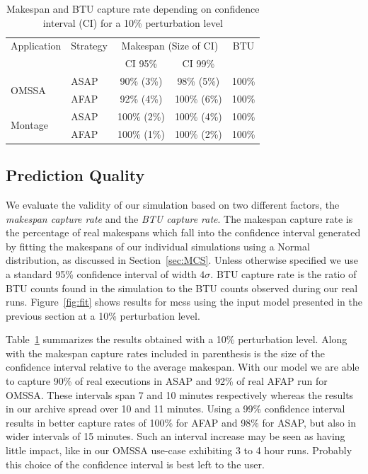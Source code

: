 \documentclass[10pt,conference,compsocconf]{IEEEtran}
\begin{document}
\begin{table}
	\centering
	\caption{Makespan and BTU capture rate depending on confidence interval
          (CI) for a 10\% perturbation level}\label{tab:fit}
	\begin{tabular}{llccc}
		\toprule
		Application&Strategy&\multicolumn{2}{c}{Makespan (Size of CI)}&BTU\\
                           &         & CI 95\% & CI 99\% &\\
		\midrule
		\multirow{2}{*}{OMSSA}&ASAP&  90\% (3\%)&  98\% (5\%)& 100\%\\
				      &AFAP&  92\% (4\%)& 100\% (6\%)& 100\%\\
		\midrule
		\multirow{2}{*}{Montage}&ASAP& 100\% (2\%)& 100\% (4\%)& 100\%\\
					&AFAP& 100\% (1\%)& 100\% (2\%)& 100\%\\
		\bottomrule
	\end{tabular}
\end{table}
\subsection{Prediction Quality}\label{sec:pq}

We evaluate the  validity of our simulation based on  two different factors, the
\emph{makespan capture  rate} and  the \emph{BTU capture rate}.   The makespan
capture rate is the percentage of  real makespans which fall into the confidence
interval generated by fitting the  makespans of our individual simulations using
a Normal distribution, as  discussed in Section~\ref{sec:MCS}.  Unless otherwise
specified we  use a standard 95\%  confidence interval of width  $4\sigma$.  BTU
capture rate is the ratio of BTU counts found in the simulation to the BTU
counts observed  during our  real runs.  Figure~\ref{fig:fit} shows  results for
\acp{mcs} using  the input  model presented  in the previous  section at  a 10\%
perturbation level.

Table~\ref{tab:fit}  summarizes the  results obtained  with a  10\% perturbation
level. Along with the makespan capture rates included in parenthesis is the size
of the confidence interval relative to  the average makespan.  With our model we
are able to  capture 90\% of real executions  in ASAP and 92\% of  real AFAP run
for OMSSA\@.  These intervals  span 7  and 10  minutes respectively  whereas the
results in our archive  spread over 10 and 11 minutes.   Using a 99\% confidence
interval results in  better capture rates of  100\% for AFAP and  98\% for ASAP,
but also  in wider intervals  of 15 minutes.  Such  an interval increase  may be
seen as having little impact, like in  our OMSSA use-case exhibiting 3 to 4 hour
runs. Probably this choice of the confidence interval is best left to the user.
\end{document}
